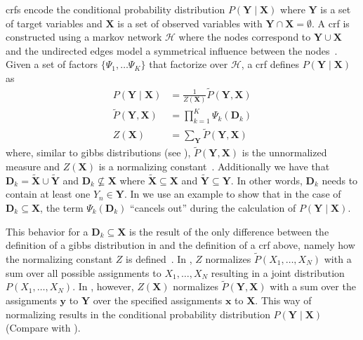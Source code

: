 \bigskip

\Glspl{crf} encode the \gls{conditional probability distribution} $P(\bm{Y}\mid\bm{X})$ where $\bm{Y}$ is a set of \glspl{target variable} and $\bm{X}$ is a set of \glspl{observed variable} with $\bm{Y}\cap\bm{X}=\emptyset$.
A \gls{crf} is constructed using a \gls{markov network} $\mathcal{H}$ where the nodes correspond to $\bm{Y}\cup\bm{X}$ and the undirected edges model a symmetrical influence between the nodes~\citep{koller2009probabilistic}.
Given a set of \glspl{factor} $\{\Psi_1,\dots\Psi_K\}$ that factorize over $\mathcal{H}$, a \gls{crf} defines $P(\bm{Y}\mid\bm{X})$ as~\citep{koller2009probabilistic}
\begin{equation}
  \label{equ:crf-factor}
  \begin{split}
    P(\bm{Y}\mid\bm{X}) & = \frac{1}{Z(\bm{X})}\tilde{P}(\bm{Y},\bm{X}) \\
    \tilde{P}(\bm{Y},\bm{X}) &= \prod_{k=1}^{K}\Psi_k(\bm{D}_k) \\
    Z(\bm{X}) & = \sum_{\bm{Y}}\tilde{P}(\bm{Y},\bm{X})
  \end{split}
\end{equation}
where, similar to \glspl{gibbs distribution} (see ), $\tilde{P}(\bm{Y},\bm{X})$ is the unnormalized measure and $Z(\bm{X})$ is a normalizing constant~\citep{koller2009probabilistic}.
Additionally we have that $\bm{D}_k=\bm{\tilde{X}}\cup\bm{\tilde{Y}}$ and $\bm{D}_k\not\subseteq\bm{X}$ where $\bm{\tilde{X}}\subseteq\bm{X}$ and $\bm{\tilde{Y}}\subseteq\bm{Y}$.
In other words, $\bm{D}_k$ needs to contain at least one $Y_n\in\bm{Y}$.
In  we use an example to show that in the case of $\bm{D}_k\subseteq\bm{X}$, the term $\Psi_k(\bm{D}_k)$ ``cancels out'' during the calculation of $P(\bm{Y}\mid\bm{X})$.

This behavior for a $\bm{D}_k\subseteq\bm{X}$ is the result of the only difference between the definition of a \gls{gibbs distribution} in  and the definition of a \gls{crf} above, namely how the normalizing constant $Z$ is defined~\citep{koller2009probabilistic}.
In , $Z$ normalizes $\tilde{P}(X_1,\dots,X_N)$ with a sum over all possible assignments to $X_1,\dots,X_N$ resulting in a \gls{joint distribution} $P(X_1,\dots,X_N)$.
In , however, $Z(\bm{X})$ normalizes $\tilde{P}(\bm{Y},\bm{X})$ with a sum over the assignments $\bm{y}$ to $\bm{Y}$ over the specified assignments $\bm{x}$ to $\bm{X}$.
This way of normalizing results in the \gls{conditional probability distribution} $P(\bm{Y}\mid\bm{X})$ (Compare with ).

